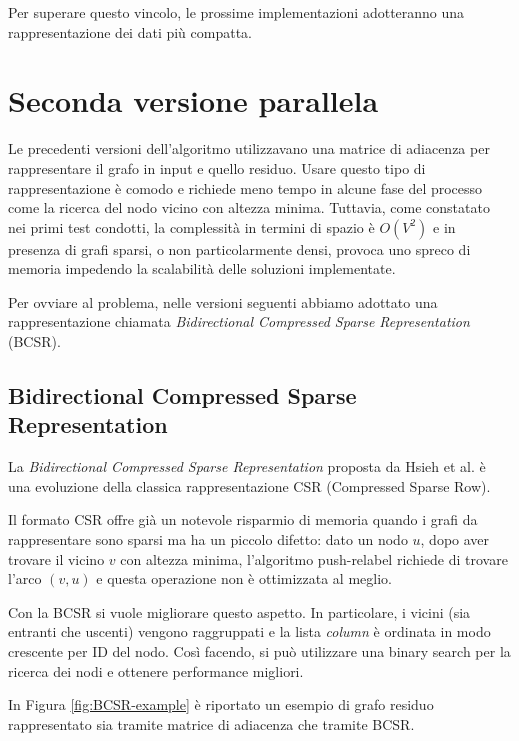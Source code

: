             Per superare questo vincolo, le prossime implementazioni adotteranno una rappresentazione dei dati più compatta.
            

    \section{Seconda versione parallela}

        Le precedenti versioni dell'algoritmo utilizzavano una matrice di adiacenza per rappresentare il grafo in input e quello residuo. Usare questo tipo di rappresentazione è comodo e richiede meno tempo in alcune fase del processo come la ricerca del nodo vicino con altezza minima. Tuttavia, come constatato nei primi test condotti, la complessità in termini di spazio è $O(V^2)$ e in presenza di grafi sparsi, o non particolarmente densi, provoca uno spreco di memoria impedendo la scalabilità delle soluzioni implementate.

        Per ovviare al problema, nelle versioni seguenti abbiamo adottato una rappresentazione chiamata \textit{Bidirectional Compressed Sparse Representation} (BCSR).
        
        \subsection{Bidirectional Compressed Sparse Representation}

            La \textit{Bidirectional Compressed Sparse Representation} proposta da Hsieh et al. \cite{EngineeringWorkload2024} è una evoluzione della classica rappresentazione CSR (Compressed Sparse Row).
            
            Il formato CSR offre già un notevole risparmio di memoria quando i grafi da rappresentare sono sparsi ma ha un piccolo difetto: dato un nodo $u$, dopo aver trovare il vicino $v$ con altezza minima, l'algoritmo push-relabel richiede di trovare l'arco $(v,u)$ e questa operazione non è ottimizzata al meglio.

            Con la BCSR si vuole migliorare questo aspetto. In particolare, i vicini (sia entranti che uscenti) vengono raggruppati e la lista \textit{column} è ordinata in modo crescente per ID del nodo. Così facendo, si può utilizzare una binary search per la ricerca dei nodi e ottenere performance migliori.

            In Figura \ref{fig:BCSR-example} è riportato un esempio di grafo residuo rappresentato sia tramite matrice di adiacenza che tramite BCSR.

